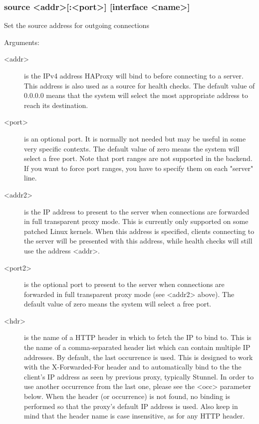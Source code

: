 {\subsubsection*{source <addr>[:<port>] [interface <name>]}


  Set the source address for outgoing connections


  Arguments:
  \begin{description}
  \item[<addr>] is the IPv4 address HAProxy will bind to before connecting to a
              server. This address is also used as a source for health checks.
              The default value of 0.0.0.0 means that the system will select
              the most appropriate address to reach its destination.

  \item[<port>] is an optional port. It is normally not needed but may be useful
              in some very specific contexts. The default value of zero means
              the system will select a free port. Note that port ranges are not
              supported in the backend. If you want to force port ranges, you
              have to specify them on each "server" line.

  \item[<addr2>] is the IP address to present to the server when connections are
              forwarded in full transparent proxy mode. This is currently only
              supported on some patched Linux kernels. When this address is
              specified, clients connecting to the server will be presented
              with this address, while health checks will still use the address
              <addr>.

  \item[<port2>] is the optional port to present to the server when connections
              are forwarded in full transparent proxy mode (see <addr2> above).
              The default value of zero means the system will select a free
              port.

  \item[<hdr>] is the name of a HTTP header in which to fetch the IP to bind to.
              This is the name of a comma-separated header list which can
              contain multiple IP addresses. By default, the last occurrence is
              used. This is designed to work with the X-Forwarded-For header
              and to automatically bind to the the client's IP address as seen
              by previous proxy, typically Stunnel. In order to use another
              occurrence from the last one, please see the <occ> parameter
              below. When the header (or occurrence) is not found, no binding
              is performed so that the proxy's default IP address is used. Also
              keep in mind that the header name is case insensitive, as for any
              HTTP header.


\end{description}}

